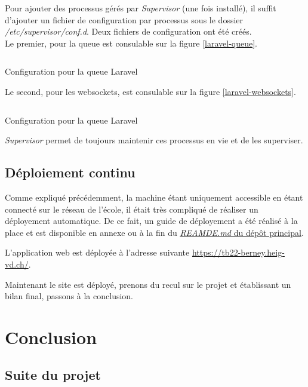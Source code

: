 \documentclass[
    iai, %
    il, %
]{heig-tb}
\begin{document}
Pour ajouter des processus gérés par \emph{Supervisor} (une fois installé), il suffit d'ajouter un fichier de configuration par processus sous le dossier \emph{/etc/supervisor/conf.d}. Deux fichiers de configuration ont été créés. \\
Le premier, pour la queue est consulable sur la figure \ref{laravel-queue}.

\begin{listing}[H]
    \inputminted{text}{assets/code/laravel-queue.conf}
    \caption{Configuration pour la queue Laravel \label{laravel-queue}}
\end{listing}

Le second, pour les \Gls{websockets}, est consulable sur la figure \ref{laravel-websockets}.

\begin{listing}[H]
    \inputminted{text}{assets/code/laravel-websockets.conf}
    \caption{Configuration pour la queue Laravel \label{laravel-websockets}}
\end{listing}

\emph{Supervisor} permet de toujours maintenir ces processus en vie et de les superviser.

\section{Déploiement continu}
Comme expliqué précédemment, la machine étant uniquement accessible en étant connecté sur le réseau de l'école, il était très compliqué de réaliser un déployement automatique.
De ce fait, un guide de déployement a été réalisé à la place et est disponible en annexe ou à la fin du \href{https://github.com/heig-fablab/fablab-manager/blob/main/README.md}{\emph{REAMDE.md} du dépôt principal}.

L'application web est déployée à l'adresse suivante \href{https://tb22-berney.heig-vd.ch/}{https://tb22-berney.heig-vd.ch/}.

Maintenant le site est déployé, prenons du recul sur le projet et établissant un bilan final, passons à la conclusion.

\chapter{Conclusion}

\section{Suite du projet}
\end{document}
